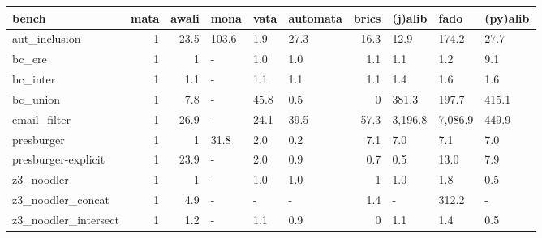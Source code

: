 \begin{tabular}{lrrlllrlll}
\hline
 bench                &   mata &   awali & mona   & vata   & automata   &   brics & (j)alib   & fado    & (py)alib   \\
\hline
 aut\_inclusion        &      1 &    23.5 & 103.6  & 1.9    & 27.3       &    16.3 & 12.9      & 174.2   & 27.7       \\
 bc\_ere               &      1 &     1   & -      & 1.0    & 1.0        &     1.1 & 1.1       & 1.2     & 9.1        \\
 bc\_inter             &      1 &     1.1 & -      & 1.1    & 1.1        &     1.1 & 1.4       & 1.6     & 1.6        \\
 bc\_union             &      1 &     7.8 & -      & 45.8   & 0.5        &     0   & 381.3     & 197.7   & 415.1      \\
 email\_filter         &      1 &    26.9 & -      & 24.1   & 39.5       &    57.3 & 3,196.8   & 7,086.9 & 449.9      \\
 presburger           &      1 &     1   & 31.8   & 2.0    & 0.2        &     7.1 & 7.0       & 7.1     & 7.0        \\
 presburger-explicit  &      1 &    23.9 & -      & 2.0    & 0.9        &     0.7 & 0.5       & 13.0    & 7.9        \\
 z3\_noodler           &      1 &     1   & -      & 1.0    & 1.0        &     1   & 1.0       & 1.8     & 0.5        \\
 z3\_noodler\_concat    &      1 &     4.9 & -      & -      & -          &     1.4 & -         & 312.2   & -          \\
 z3\_noodler\_intersect &      1 &     1.2 & -      & 1.1    & 0.9        &     0   & 1.1       & 1.4     & 0.5        \\
\hline
\end{tabular}
